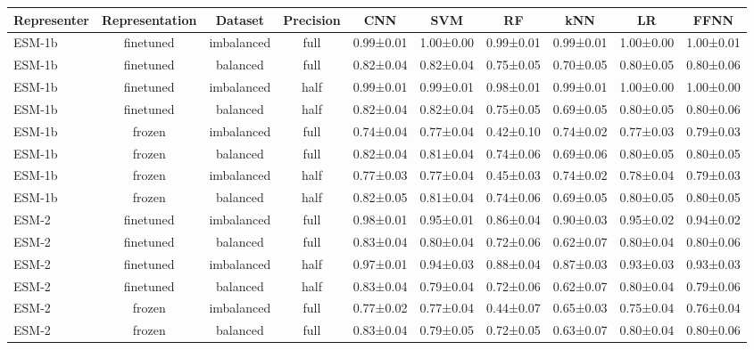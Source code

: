 \begin{tabular}{lccccccccc}
\toprule
 \textbf{Representer} & \textbf{Representation} &    \textbf{Dataset} & \textbf{Precision} &       \textbf{CNN} &       \textbf{SVM} &        \textbf{RF} &       \textbf{kNN} &        \textbf{LR} &      \textbf{FFNN} \\
\midrule
      ESM-1b &      finetuned & imbalanced &      full & 0.99±0.01 & 1.00±0.00 & 0.99±0.01 & 0.99±0.01 & 1.00±0.00 & 1.00±0.01 \\
      ESM-1b &      finetuned &   balanced &      full & 0.82±0.04 & 0.82±0.04 & 0.75±0.05 & 0.70±0.05 & 0.80±0.05 & 0.80±0.06 \\
      ESM-1b &      finetuned & imbalanced &      half & 0.99±0.01 & 0.99±0.01 & 0.98±0.01 & 0.99±0.01 & 1.00±0.00 & 1.00±0.00 \\
      ESM-1b &      finetuned &   balanced &      half & 0.82±0.04 & 0.82±0.04 & 0.75±0.05 & 0.69±0.05 & 0.80±0.05 & 0.80±0.06 \\
      ESM-1b &         frozen & imbalanced &      full & 0.74±0.04 & 0.77±0.04 & 0.42±0.10 & 0.74±0.02 & 0.77±0.03 & 0.79±0.03 \\
      ESM-1b &         frozen &   balanced &      full & 0.82±0.04 & 0.81±0.04 & 0.74±0.06 & 0.69±0.06 & 0.80±0.05 & 0.80±0.05 \\
      ESM-1b &         frozen & imbalanced &      half & 0.77±0.03 & 0.77±0.04 & 0.45±0.03 & 0.74±0.02 & 0.78±0.04 & 0.79±0.03 \\
      ESM-1b &         frozen &   balanced &      half & 0.82±0.05 & 0.81±0.04 & 0.74±0.06 & 0.69±0.05 & 0.80±0.05 & 0.80±0.05 \\
       ESM-2 &      finetuned & imbalanced &      full & 0.98±0.01 & 0.95±0.01 & 0.86±0.04 & 0.90±0.03 & 0.95±0.02 & 0.94±0.02 \\
       ESM-2 &      finetuned &   balanced &      full & 0.83±0.04 & 0.80±0.04 & 0.72±0.06 & 0.62±0.07 & 0.80±0.04 & 0.80±0.06 \\
       ESM-2 &      finetuned & imbalanced &      half & 0.97±0.01 & 0.94±0.03 & 0.88±0.04 & 0.87±0.03 & 0.93±0.03 & 0.93±0.03 \\
       ESM-2 &      finetuned &   balanced &      half & 0.83±0.04 & 0.79±0.04 & 0.72±0.06 & 0.62±0.07 & 0.80±0.04 & 0.79±0.06 \\
       ESM-2 &         frozen & imbalanced &      full & 0.77±0.02 & 0.77±0.04 & 0.44±0.07 & 0.65±0.03 & 0.75±0.04 & 0.76±0.04 \\
       ESM-2 &         frozen &   balanced &      full & 0.83±0.04 & 0.79±0.05 & 0.72±0.05 & 0.63±0.07 & 0.80±0.04 & 0.80±0.06 \\

\end{tabular}
